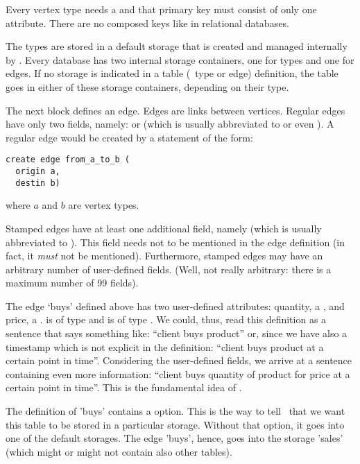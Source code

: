 Every vertex type needs a  and
that primary key must consist of only one attribute.
There are no composed keys like in relational
databases.

The types are stored in a default storage
that is created and managed internally by \nowdb.
Every database has two internal storage containers,
one for types and one for edges. If no storage
is indicated in a table (\ie\ type or edge) definition,
the table goes in either of these storage containers,
depending on their type.

The next block defines an  edge.
Edges are links between vertices. Regular edges
have only two fields, namely: 
or  (which is usually abbreviated
to  or even ).
A regular edge would be created by a statement of the form:

\begin{sqlcode}
\begin{lstlisting}
create edge from_a_to_b (
  origin a,
  destin b) 
\end{lstlisting}
\end{sqlcode}

where $a$ and $b$ are vertex types.

Stamped edges have at least one additional field,
namely  (which is usually abbreviated
to ). This field needs not to be mentioned
in the edge definition (in fact, it \emph{must} not be
mentioned). Furthermore, stamped edges may have an
arbitrary number of user-defined fields.
(Well, not really arbitrary: there is a maximum number
of 99 fields).

The edge `buys' defined above has two user-defined
attributes: quantity, a , and
price, a .  is of type
 and  is of type .
We could, thus, read this definition as a sentence
that says something like: ``client buys product'' or,
since we have also a timestamp which is not explicit
in the definition:
``client buys product at a certain point in time''.
Considering the user-defined fields,
we arrive at a sentence containing even more information:
``client buys quantity of product for price at a certain point in time''.
This is the fundamental idea of \nowdb.

The definition of 'buys' contains a  option.
This is the way to tell \nowdb\ that we want this table 
to be stored in a particular storage. Without that option,
it goes into one of the default storages. The edge 'buys',
hence, goes into the storage 'sales' (which might or
might not contain also other tables).

